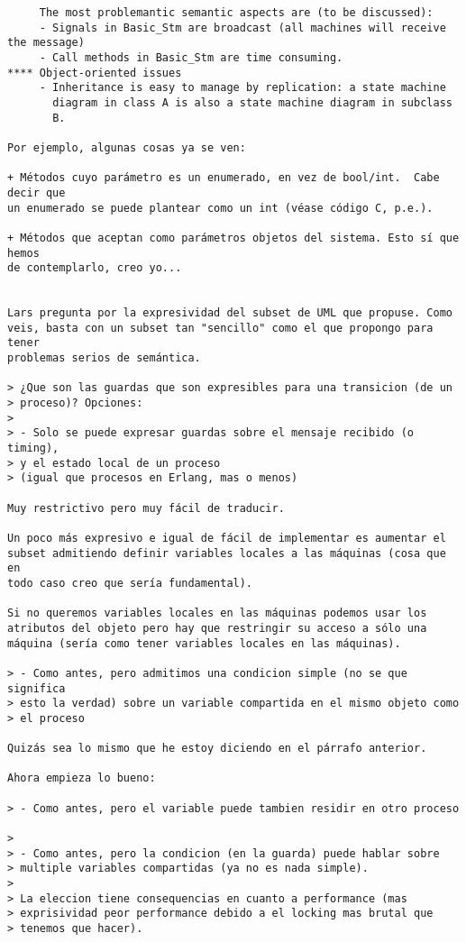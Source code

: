 \begin{verbatim}
     The most problemantic semantic aspects are (to be discussed):
     - Signals in Basic_Stm are broadcast (all machines will receive the message)
     - Call methods in Basic_Stm are time consuming.
**** Object-oriented issues
     - Inheritance is easy to manage by replication: a state machine
       diagram in class A is also a state machine diagram in subclass
       B.

Por ejemplo, algunas cosas ya se ven:

+ Métodos cuyo parámetro es un enumerado, en vez de bool/int.  Cabe decir que 
un enumerado se puede plantear como un int (véase código C, p.e.).

+ Métodos que aceptan como parámetros objetos del sistema. Esto sí que hemos 
de contemplarlo, creo yo...


Lars pregunta por la expresividad del subset de UML que propuse. Como
veis, basta con un subset tan "sencillo" como el que propongo para tener
problemas serios de semántica.

> ¿Que son las guardas que son expresibles para una transicion (de un
> proceso)? Opciones:
>
> - Solo se puede expresar guardas sobre el mensaje recibido (o timing),
> y el estado local de un proceso
> (igual que procesos en Erlang, mas o menos)

Muy restrictivo pero muy fácil de traducir.

Un poco más expresivo e igual de fácil de implementar es aumentar el
subset admitiendo definir variables locales a las máquinas (cosa que en
todo caso creo que sería fundamental).

Si no queremos variables locales en las máquinas podemos usar los
atributos del objeto pero hay que restringir su acceso a sólo una
máquina (sería como tener variables locales en las máquinas).

> - Como antes, pero admitimos una condicion simple (no se que significa
> esto la verdad) sobre un variable compartida en el mismo objeto como
> el proceso

Quizás sea lo mismo que he estoy diciendo en el párrafo anterior.

Ahora empieza lo bueno:

> - Como antes, pero el variable puede tambien residir en otro proceso

>
> - Como antes, pero la condicion (en la guarda) puede hablar sobre
> multiple variables compartidas (ya no es nada simple).
>
> La eleccion tiene consequencias en cuanto a performance (mas
> exprisividad peor performance debido a el locking mas brutal que
> tenemos que hacer).


\end{verbatim}
